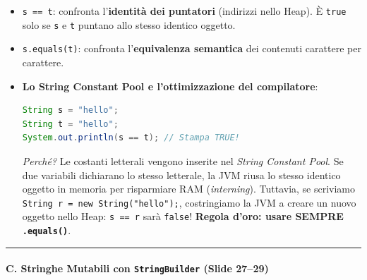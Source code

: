 \documentclass[11pt,a4paper]{article}
\newcommand{\passthrough}[1]{#1}
\begin{document}
\begin{itemize}
  \begin{itemize}
  \item
    \passthrough{\lstinline!s == t!}: confronta l'\textbf{identità dei
    puntatori} (indirizzi nello Heap). È \passthrough{\lstinline!true!}
    solo se \passthrough{\lstinline!s!} e \passthrough{\lstinline!t!}
    puntano allo stesso identico oggetto.
  \item
    \passthrough{\lstinline!s.equals(t)!}: confronta
    l'\textbf{equivalenza semantica} dei contenuti carattere per
    carattere.
  \item
    \textbf{Lo String Constant Pool e l'ottimizzazione del compilatore}:

\begin{lstlisting}[language=Java]
String s = "hello";
String t = "hello";
System.out.println(s == t); // Stampa TRUE!
\end{lstlisting}

    \emph{Perché?} Le costanti letterali vengono inserite nel
    \emph{String Constant Pool}. Se due variabili dichiarano lo stesso
    letterale, la JVM riusa lo stesso identico oggetto in memoria per
    risparmiare RAM (\emph{interning}). Tuttavia, se scriviamo
    \passthrough{\lstinline!String r = new String("hello");!},
    costringiamo la JVM a creare un nuovo oggetto nello Heap:
    \passthrough{\lstinline!s == r!} sarà
    \passthrough{\lstinline!false!}! \textbf{Regola d'oro: usare SEMPRE
    \passthrough{\lstinline!.equals()!}}.
  \end{itemize}
\end{itemize}

\begin{center}\rule{0.5\linewidth}{0.5pt}\end{center}

\paragraph{\texorpdfstring{C. Stringhe Mutabili con
\texttt{StringBuilder} (Slide
27--29)}{C. Stringhe Mutabili con StringBuilder (Slide 27--29)}}\label{c.-stringhe-mutabili-con-stringbuilder-slide-2729}
\end{document}
